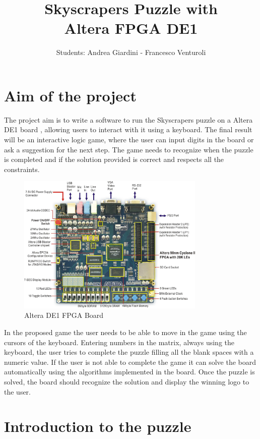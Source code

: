 \documentclass[12pt]{report}
\title{Skyscrapers Puzzle with\\
Altera FPGA DE1}
\date{\vspace{-5ex}}
\begin{document}
\author{Students: Andrea Giardini - Francesco Venturoli}
\maketitle

\chapter*{Aim of the project}

The project aim is to write a software to run the Skyscrapers puzzle on
a Altera DE1 board \cite{AlteraDE1Board}, allowing users to interact with
it using a keyboard. The final result will be an interactive logic game,
where the user can input digits in the board or ask a suggestion for the
next step. The game needs to recognize when the puzzle is completed and if
the solution provided is correct and respects all the constraints.

\begin{figure}[H]
  \centering
  \includegraphics[keepaspectratio,width=0.8\textwidth]{images/Altera_DE1_Board.jpg}
  \caption{Altera DE1 FPGA Board}
\end{figure}

In the proposed game the user needs to be able to move in the game using
the cursors of the keyboard. Entering numbers in the matrix, always using
the keyboard, the user tries to complete the puzzle filling all the blank
spaces with a numeric value. If the user is not able to complete the game
it can solve the board automatically using the algorithms implemented in
the board. Once the puzzle is solved, the board should recognize the
solution and display the winning logo to the user.

\chapter*{Introduction to the puzzle}
\end{document}
